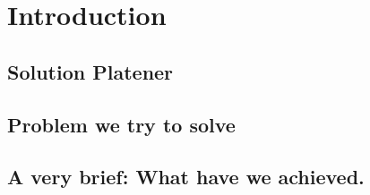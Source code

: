 \documentclass[../ClassicThesis.tex]{subfiles}
\begin{document}
\chapter{Introduction}\label{ch:introduction}

\section{Solution Platener}

\section{Problem we try to solve}

\section{A very brief: What have we achieved.}
\end{document}
